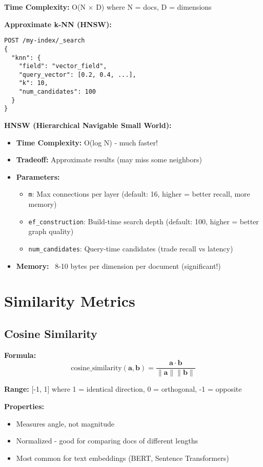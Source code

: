 \documentclass[10pt]{article}
\begin{document}
\textbf{Time Complexity:} O(N × D) where N = docs, D = dimensions

\textbf{Approximate k-NN (HNSW):}
\begin{lstlisting}
POST /my-index/_search
{
  "knn": {
    "field": "vector_field",
    "query_vector": [0.2, 0.4, ...],
    "k": 10,
    "num_candidates": 100
  }
}
\end{lstlisting}

\textbf{HNSW (Hierarchical Navigable Small World):}
\begin{itemize}
\item \textbf{Time Complexity:} O(log N) - much faster!
\item \textbf{Tradeoff:} Approximate results (may miss some neighbors)
\item \textbf{Parameters:}
  \begin{itemize}
  \item \texttt{m}: Max connections per layer (default: 16, higher = better recall, more memory)
  \item \texttt{ef\_construction}: Build-time search depth (default: 100, higher = better graph quality)
  \item \texttt{num\_candidates}: Query-time candidates (trade recall vs latency)
  \end{itemize}
\item \textbf{Memory:} ~8-10 bytes per dimension per document (significant!)
\end{itemize}

\section{Similarity Metrics}

\subsection{Cosine Similarity}

\textbf{Formula:}
\[
\text{cosine\_similarity}(\mathbf{a}, \mathbf{b}) = \frac{\mathbf{a} \cdot \mathbf{b}}{\|\mathbf{a}\| \|\mathbf{b}\|}
\]

\textbf{Range:} [-1, 1] where 1 = identical direction, 0 = orthogonal, -1 = opposite

\textbf{Properties:}
\begin{itemize}
\item Measures angle, not magnitude
\item Normalized - good for comparing docs of different lengths
\item Most common for text embeddings (BERT, Sentence Transformers)
\end{itemize}
\end{document}
